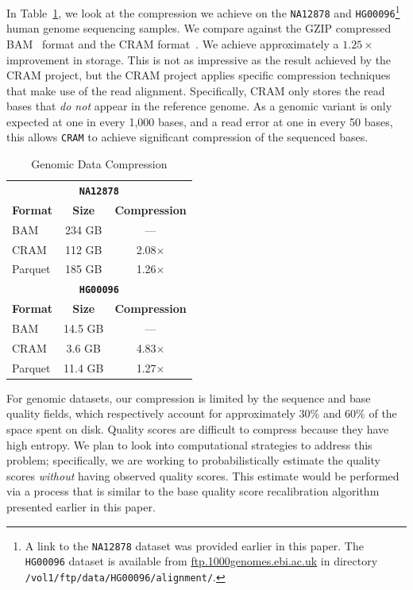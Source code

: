 \documentclass[masters]{ucbthesis}
\begin{document}
In Table~\ref{tab:genomic-compression}, we look at the compression we achieve on the \texttt{NA12878}
and \texttt{HG00096}\footnote{A link to the \texttt{NA12878} dataset was provided earlier in this paper. The
\texttt{HG00096} dataset is available from \url{ftp.1000genomes.ebi.ac.uk} in directory 
\texttt{/vol1/ftp/data/HG00096/alignment/}.} human genome sequencing samples. We compare against the
GZIP compressed BAM~\cite{li09} format and the CRAM format~\cite{fritz11}. We achieve approximately a
$1.25\times$ improvement in storage. This is not as impressive as the result achieved by the CRAM project,
but the CRAM project applies specific compression techniques that make use of the read alignment. Specifically,
CRAM only stores the read bases that \emph{do not} appear in the reference genome. As a
genomic variant is only expected at one in every 1,000 bases, and a read error at one in every 50 bases,
this allows \texttt{CRAM} to achieve significant compression of the sequenced bases.

\begin{table}[h]
\caption{Genomic Data Compression}
\label{tab:genomic-compression}
\begin{center}
\begin{tabular}{ l c c }
\hline
\multicolumn{3}{c}{\textbf{\texttt{NA12878}}} \\
\textbf{Format} & \textbf{Size} & \textbf{Compression} \\
\hline
\hline
BAM & 234 GB & --- \\
CRAM & 112 GB & 2.08$\times$ \\
Parquet & 185 GB & 1.26$\times$ \\
\hline
\multicolumn{3}{c}{\textbf{\texttt{HG00096}}} \\
\textbf{Format} & \textbf{Size} & \textbf{Compression} \\
\hline
\hline
BAM & 14.5 GB & --- \\
CRAM & 3.6 GB & 4.83$\times$ \\
Parquet & 11.4 GB & 1.27$\times$ \\
\hline
\end{tabular}
\end{center}
\end{table}

For genomic datasets, our compression is limited by the sequence and base quality fields, which respectively
account for approximately 30\% and 60\% of the space spent on disk. Quality scores are difficult to compress
because they have high entropy. We plan to look into computational strategies to address this problem;
specifically, we are working to probabilistically estimate the quality scores \emph{without} having observed quality
scores. This estimate would be performed via a process that is similar to the base quality score recalibration algorithm
presented earlier in this paper.
\end{document}
